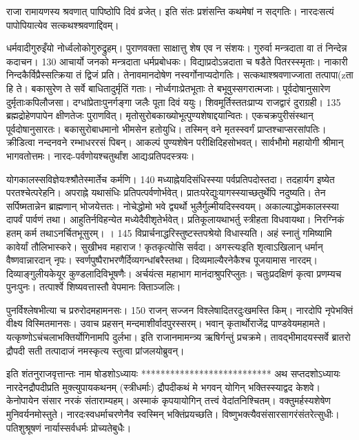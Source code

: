 राजा
रामायणस्य श्रवणात् पापिष्ठोपि दिवं व्रजेत्।
 इति संतः प्रशंसन्ति कथमेषां न सद्गतिः।
 नारदःसत्यं पापोपियात्येव सत्कथश्श्रवणाद्दिवम्।
 
धर्मवादीगुरुइँयो नोर्ध्वलोकोगुरुद्रुहम्।
 पुराणवक्ता साक्षात्तु शेष एव न संशयः।
 गुरुर्वा मन्त्रदाता वा तं निन्देन्न कदाचन।
 130 आचार्यो जनको मन्त्रदाता धर्मप्रबोधकः।
 विद्याप्रदोऽन्नदाता च षडैते पितरस्स्मृताः।
 नाकारी निन्दकैर्विप्रैस्सत्क्रिया तं द्विजं प्रति।
 तेनावमानदोषेण नस्वर्गोनाप्यदोगतिः।
 सत्कथाश्श्रवणाज्जाता तत्पापा(zता हि ते।
 बकासुरेण ते सर्वे बाधितादुर्मृतिं गताः।
 नोर्ध्वगाःप्रेतभूताः ते बभूवुस्सगरात्मजाः।
 पूर्वदोषानुसारेण दुर्मृताःकपिलौजसा।
 दग्धांप्रेताःपुनर्गङ्गा जलैः पूता दिवं ययुः।
 शिवमूर्तिस्ततःप्राप्य राजद्वारं दुराग्रही।
 135 ब्रह्मद्रोहेणपापेन क्षीणतेजः पुराणवित्।
 मृतोसुरोबकाख्योभूत्पुण्यशेषाद्दयान्वितः।
 एकचक्रपुरीसंस्थान् पूर्वदोषानुसारतः।
 बकासुरोबाधमानो भीमसेन हतोयुधि।
 तस्मिन् वने मृतस्स्वर्गं प्राप्तश्चाप्सरसांपतिः।
 क्रीडित्वा नन्दनवने रम्भाधररसं पिबन्।
 आकल्पं पुण्यशेषेन परीक्षिदिहसोभवत्।
 सार्वभौमो महायोगी श्रीमान् भागवतोत्तमः।
 नारदः-पर्वणोयश्चतुर्थांश आद्यःप्रतिपदस्त्रयः।
 
योगकालस्सविज्ञेयःश्श्रौतेस्मार्तेच कर्मणि।
 140 मध्याह्नेयदिसंधिस्स्या पर्वप्रतिपदोस्तदा।
 तदहार्यग इष्येत परतश्चेत्परेहनि।
 अपराह्ने यथासंधिः प्रतिपत्पर्वणोर्भवेत्।
 प्रातःपरेद्युःयागस्स्याच्छतुर्थेपि नदुष्यति।
 तेन सर्पिष्मतान्नेन ब्राह्मणान् भोजयेत्ततः।
 नोचेद्धोमो भवे द्व्यर्थो भुलैर्गुल्मीयदिस्स्वयम्।
 अकाल्याद्धोमकालस्स्या दापर्वं पार्वणं तथा।
 आहुतिर्नविहन्येत मध्येदैवीशृतेर्भवेत्।
 प्रतिकूलायथाभर्तु स्त्रीहता विधवायथा।
 निरग्निकं हतम् कर्म तथाऽनर्चितभूसुरम्।
 ।
 145 विप्रार्चनाद्धरिस्तुष्टस्तपश्रेयो विधास्यति।
 अहं स्नातुं गमिष्यामि कावेर्यां तौलिभास्करे।
 सुखीभव महाराज ! कृतकृत्योसि सर्वदा।
 अगस्त्यःइति शृत्वाऽखिलान् धर्मान् वैष्णवान्नारदान् नृपः।
 स्वर्णपुष्पैराभरणैर्दिव्यगन्धांबरैस्तथा।
 दिव्यमाल्यैरनेकैश्च पूजयामास नारदम्।
 दिव्याङ्गुलीयकेयूर कुण्डलादिविभूषणैः।
 अर्चयंत्स महाभाग मानंदाश्रुपरिप्लुतः।
 चतुःप्रदक्षिणं कृत्वा प्रणम्यच पुनःपुनः।
 तत्पार्श्वे शिष्यवत्तास्तौ वेपमानः क्तिाञ्जलिः।
 
पुनर्विश्लेषभीत्या च प्ररुरोदमहामनसः।
 150 राजन् सज्जन विश्लेषादितरदुःखमस्ति किम्।
 नारदोपि नृपेभक्तिं वीक्ष्य विस्मितमानसः।
 उवाच प्रहसन् मन्दमाशीर्वादपुरस्सरम्।
 भवान् कृतार्थोराजेंद्र पाण्डवेयमहामते।
 यत्कृष्णोऽचंचलाभक्तिर्योगिनामपि दुर्लभा।
 इति राजानमामन्त्र्य ऋषिर्गन्तुं प्रचक्रमे।
 तावद्भीमादयस्सर्वे ब्रातरो द्रौपदी सती तत्पादाजं नमस्कृत्य स्तुत्वा प्रांजलयोब्रुवन्।
 
इति शंतनुराजवृत्तान्तः नाम षोडशोऽध्यायः
***************************
अथ सप्तदशोऽध्यायः नारदेनद्रौपदीप्रति मुक्त्युपायकथनम् (स्त्रीधर्माः) द्रौपदीकथं मे भगवन् योगिन् भक्तिस्स्याद्वद केशवे।
 केनोपायेन संसार नरकं संताराम्यहम्।
 अस्माकं कृपयायोगिन् तत्त्वं वेदांतनिश्चितम्।
 वक्तुमर्हस्यशेषेण मुनिवर्यनमोस्तुते।
 नारदःस्वधर्माचरणेनैव स्वस्मिन् भक्तिंप्रयच्छति।
 विष्णुभक्त्यैवसंसारसागरंसंतरेत्सुधीः।
 पतिशुश्रूषणं नार्यास्सर्वधर्मः प्रोच्यतेबुधैः।
 
